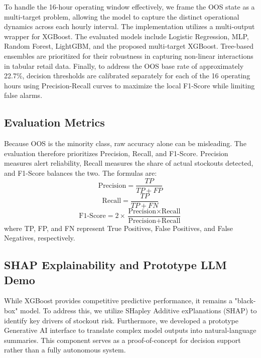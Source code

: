 \documentclass[11pt, a4paper]{article}
\begin{document}
To handle the 16-hour operating window effectively, we frame the OOS state as a multi-target problem, allowing the model to capture the distinct operational dynamics across each hourly interval. The implementation utilizes a multi-output wrapper for XGBoost. The evaluated models include Logistic Regression, MLP, Random Forest, LightGBM, and the proposed multi-target XGBoost. Tree-based ensembles are prioritized for their robustness in capturing non-linear interactions in tabular retail data. Finally, to address the OOS base rate of approximately 22.7\%, decision thresholds are calibrated separately for each of the 16 operating hours using Precision-Recall curves to maximize the local F1-Score while limiting false alarms.

\subsection{Evaluation Metrics}
Because OOS is the minority class, raw accuracy alone can be misleading. The evaluation therefore prioritizes Precision, Recall, and F1-Score. Precision measures alert reliability, Recall measures the share of actual stockouts detected, and F1-Score balances the two. The formulas are:
\begin{equation}
    \text{Precision} = \frac{TP}{TP + FP}
\end{equation}
\begin{equation}
    \text{Recall} = \frac{TP}{TP + FN}
\end{equation}
\begin{equation}
    \text{F1-Score} = 2 \times \frac{\text{Precision} \times \text{Recall}}{\text{Precision} + \text{Recall}}
\end{equation}
where TP, FP, and FN represent True Positives, False Positives, and False Negatives, respectively.

\subsection{SHAP Explainability and Prototype LLM Demo}
While XGBoost provides competitive predictive performance, it remains a "black-box" model. To address this, we utilize SHapley Additive exPlanations (SHAP) to identify key drivers of stockout risk. Furthermore, we developed a prototype Generative AI interface to translate complex model outputs into natural-language summaries. This component serves as a proof-of-concept for decision support rather than a fully autonomous system.
\end{document}
